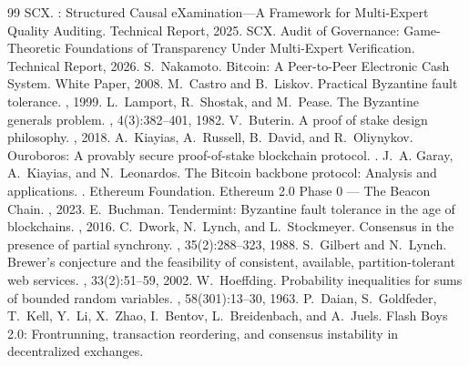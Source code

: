 \documentclass[11pt,a4paper]{article}
\theoremstyle{definition}
\begin{document}
\begin{thebibliography}{99}
SCX.
: Structured Causal eXamination---A Framework for Multi-Expert Quality Auditing.
\newblock Technical Report, 2025.
SCX.
 Audit of Governance: Game-Theoretic Foundations of Transparency Under Multi-Expert Verification.
\newblock Technical Report, 2026.
S.~Nakamoto.
\newblock Bitcoin: A Peer-to-Peer Electronic Cash System.
\newblock White Paper, 2008.
M.~Castro and B.~Liskov.
\newblock Practical Byzantine fault tolerance.
, 1999.
L.~Lamport, R.~Shostak, and M.~Pease.
\newblock The Byzantine generals problem.
, 4(3):382--401, 1982.
V.~Buterin.
\newblock A proof of stake design philosophy.
, 2018.
A.~Kiayias, A.~Russell, B.~David, and R.~Oliynykov.
\newblock Ouroboros: A provably secure proof-of-stake blockchain protocol.
.
J.~A. Garay, A.~Kiayias, and N.~Leonardos.
\newblock The Bitcoin backbone protocol: Analysis and applications.
.
Ethereum Foundation.
\newblock Ethereum 2.0 Phase 0 --- The Beacon Chain.
, 2023.
E.~Buchman.
\newblock Tendermint: Byzantine fault tolerance in the age of blockchains.
, 2016.
C.~Dwork, N.~Lynch, and L.~Stockmeyer.
\newblock Consensus in the presence of partial synchrony.
, 35(2):288--323, 1988.
S.~Gilbert and N.~Lynch.
\newblock Brewer's conjecture and the feasibility of consistent, available, partition-tolerant web services.
, 33(2):51--59, 2002.
W.~Hoeffding.
\newblock Probability inequalities for sums of bounded random variables.
, 58(301):13--30, 1963.
P.~Daian, S.~Goldfeder, T.~Kell, Y.~Li, X.~Zhao, I.~Bentov, L.~Breidenbach, and A.~Juels.
\newblock Flash Boys 2.0: Frontrunning, transaction reordering, and consensus instability in decentralized exchanges.

\end{thebibliography}
\end{document}
